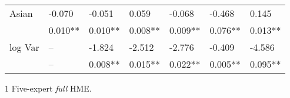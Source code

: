 \documentclass[12pt]{article}
\begin{document}
\begin{table}
\begin{threeparttable}
\begin{tabular}[l]{l l l l l l l}
      Asian       & -0.070   & -0.051  & 0.059  & -0.068   & -0.468 & 0.145     \\
                  & 0.010**  & 0.010** & 0.008**& 0.009**  & 0.076**& 0.013**   \\[0.3cm]
      
      log Var    & --       & -1.824   & -2.512 & -2.776   & -0.409 & -4.586    \\
                 & --       & 0.008**  & 0.015**& 0.022**  & 0.005**& 0.095**   \\[0.3cm]


      \hline
    \end{tabular}
    \begin{tablenotes}
      \item[1]{\footnotesize Five-expert \textit{full} HME.}
    \end{tablenotes} \label{tbl:model_local_experts}
  \end{threeparttable}
\end{table}
\end{document}
